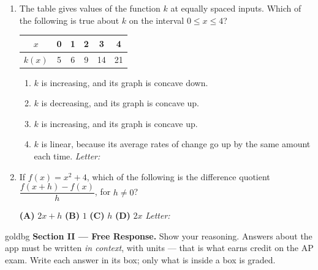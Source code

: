 \documentclass[10pt]{article}
\begin{document}
\begin{enumerate}[leftmargin=1.9em, itemsep=12pt]
\item The table gives values of the function $k$ at equally spaced inputs. Which of the
      following is true about $k$ on the interval $0 \le x \le 4$?

      \smallskip
      \begin{center}
      \renewcommand{\arraystretch}{1.2}
      \begin{tabular}{|c|c|c|c|c|c|}
      \hline
      $x$    & 0 & 1 & 2 & 3  & 4  \\ \hline
      $k(x)$ & 5 & 6 & 9 & 14 & 21 \\ \hline
      \end{tabular}
      \end{center}
      \begin{enumerate}[leftmargin=2.6em, itemsep=2pt]
        \item[(A)] $k$ is increasing, and its graph is concave down.
        \item[(B)] $k$ is decreasing, and its graph is concave up.
        \item[(C)] $k$ is increasing, and its graph is concave up.
        \item[(D)] $k$ is linear, because its average rates of change go up by the same amount each time. \hfill\textit{Letter:}~\gradedblank[id=ap4, type=choice, points=1, answer=C]{0.42in}{13pt}
      \end{enumerate}

\item If $f(x) = x^2 + 4$, which of the following is the difference quotient
      $\dfrac{f(x + h) - f(x)}{h}$, for $h \ne 0$?

      \smallskip
      \textbf{(A)} $2x + h$ \hspace{3em} \textbf{(B)} $1$ \hspace{3em} \textbf{(C)} $h$ \hspace{3em} \textbf{(D)} $2x$ \hfill\textit{Letter:}~\gradedblank[id=ap5, type=choice, points=1, answer=A]{0.42in}{13pt}

\end{enumerate}

\newpage

\begin{headlinebox}{goldbg}
\small
\textbf{Section II --- Free Response.} Show your reasoning. Answers about the app must be
written \emph{in context}, with units --- that is what earns credit on the AP exam. Write each answer in its box; only what is inside a box is graded.
\end{headlinebox}
\end{document}

